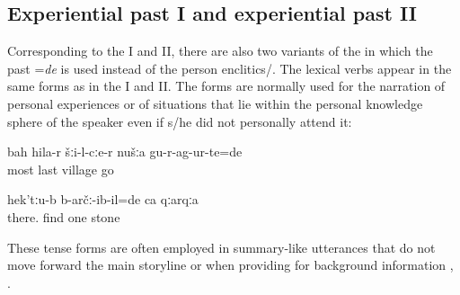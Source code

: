 
\subsection{Experiential past I and experiential past II}
\label{ssec:Experiential past I and experiential past II}

Corresponding to the  I and II, there are also two variants of the  in which the past  =\textit{de} is used instead of the person enclitics\slash {}. The lexical verbs appear in the same forms as in the  I and II. The  forms are normally used for the narration of personal experiences or of situations that lie within the personal knowledge sphere of the speaker even if s/he did not personally attend it:

\begin{exe}
	\ex	\label{ex:As the very last we moved away from the village analytic}
	\gll	bah	hila-r šːi-l-cːe-r	nušːa	gu-r-ag-ur-te=de\\
		most	last	village		go\\
	\glt	{}

	\ex	\label{ex:‎Up there we found a stone analytic}
	\gll	hek'tːu-b	b-arčː-ib-il=de	ca	qːarqːa\\
		there.	find	one	stone\\
	\glt	{}
\end{exe}

These tense forms are often employed in summary-like utterances that do not move forward the main storyline  or when providing for background information , .

